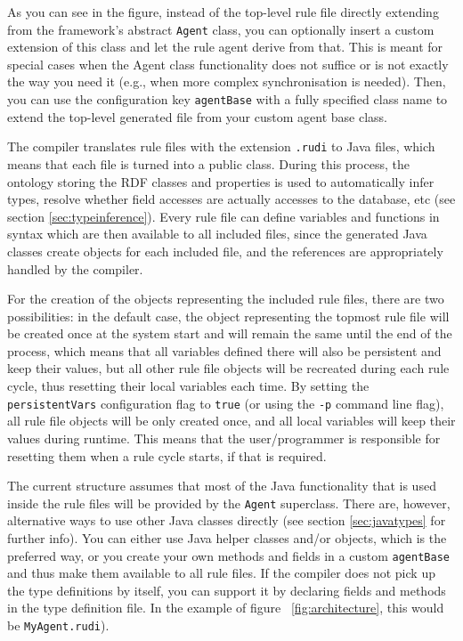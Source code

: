 As you can see in the figure, instead of the top-level rule file
directly extending from the framework's abstract \texttt{Agent} class,
you can optionally insert a custom extension of this class and let the
rule agent derive from that. This is meant for special cases when the
Agent class functionality does not suffice or is not exactly the way
you need it (e.g., when more complex synchronisation is needed). Then,
you can use the configuration key \texttt{agentBase} with a fully
specified class name to extend the top-level generated file from your
custom agent base class.

The \vonda compiler translates rule files with the extension \texttt{.rudi} to
Java files, which means that each file is turned into a public class. During
this process, the ontology storing the RDF classes and properties is used to
automatically infer types, resolve whether field accesses are actually accesses
to the database, etc (see section \ref{sec:typeinference}).  Every rule file
can define variables and functions in \vonda syntax which are then available to
all included files, since the generated Java classes create objects for each
included file, and the references are appropriately handled by the compiler.

For the creation of the objects representing the included rule files, there are
two possibilities: in the default case, the object representing the topmost
rule file will be created once at the system start and will remain the same
until the end of the process, which means that all variables defined there will
also be persistent and keep their values, but all other rule file objects will
be recreated during each rule cycle, thus resetting their local variables each
time. By setting the \texttt{persistentVars} configuration flag to
\texttt{true} (or using the \texttt{-p} command line flag), all rule file
objects will be only created once, and all local variables will keep their
values during runtime. This means that the user/programmer is responsible for
resetting them when a rule cycle starts, if that is required.

The current structure assumes that most of the Java functionality that
is used inside the rule files will be provided by the \texttt{Agent}
superclass. There are, however, alternative ways to use other Java
classes directly (see section \ref{sec:javatypes} for further
info). You can either use Java helper classes and/or objects, which is
the preferred way, or you create your own methods and fields in a
custom \texttt{agentBase} and thus make them available to all rule
files. If the compiler does not pick up the type definitions by
itself, you can support it by declaring fields and methods in the type
definition file. In the example of figure ~\ref{fig:architecture},
this would be \texttt{MyAgent.rudi}).

